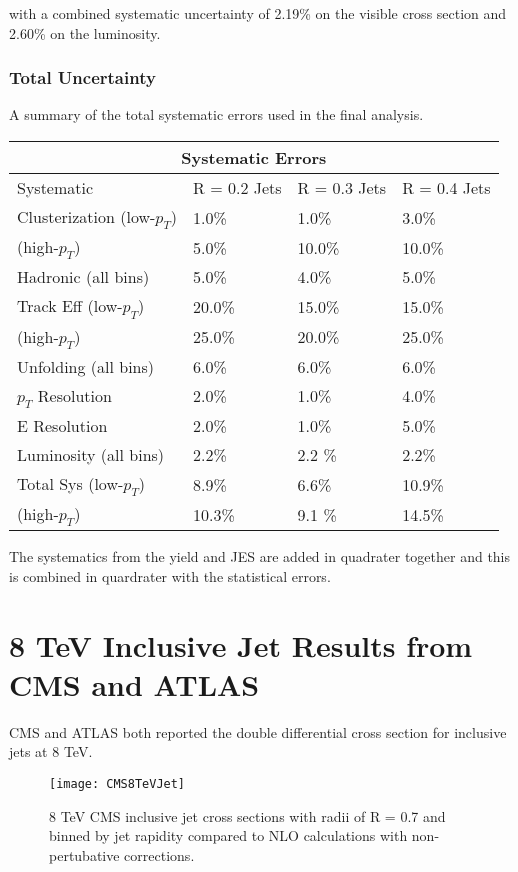 \noindent
with a combined systematic uncertainty of 2.19\% on the visible cross section and 2.60\% on the luminosity. 


\subsubsection{Total Uncertainty}

A summary of the total systematic errors used in the final analysis.

\begin{tabular}{ |p{5cm}||p{3cm}|p{3cm}|p{3cm}|  }
 \hline
 \multicolumn{4}{|c|}{Systematic Errors} \\
 \hline
 Systematic &R = 0.2 Jets & R = 0.3 Jets& R = 0.4 Jets\\
 \hline
Clusterization (low-$p_{T}$) & 1.0\%    &1.0\%&  3.0\%\\
 (high-$p_{T}$)           &  5.0\%  & 10.0\%   &  10.0\%\\
Hadronic (all bins)&   5.0\% & 4.0\% & 5.0\%\\
Track Eff (low-$p_{T}$)&20.0\% & 15.0\% & 15.0\%\\
 (high-$p_{T}$)            &  25.0\%  & 20.0\%   &  25.0\%\\
Unfolding (all bins)& 6.0\% & 6.0\%&  6.0\%\\
$p_{T}$ Resolution & 2.0\% & 1.0\% & 4.0\%\\
E Resolution& 2.0\%   &1.0\% & 5.0\%\\
Luminosity (all bins) & 2.2\%  & 2.2 \% & 2.2\%\\
 \hline
 \hline
Total Sys (low-$p_{T}$) & 8.9\%  & 6.6\% & 10.9\%\\
(high-$p_{T}$) & 10.3\%  & 9.1 \% & 14.5\%\\
\hline
\end{tabular}


\noindent

The systematics from the yield and JES are added in quadrater together and this is combined in quardrater with the statistical errors.

\section{8 TeV Inclusive Jet Results from CMS and ATLAS}

CMS\cite{CMS:2013kda} and ATLAS\cite{Aaboud:2017dvo} both reported the double differential cross section for inclusive jets at 8 TeV.  

\begin{figure}[h]
\texttt{[image: CMS8TeVJet]}
\centering
\caption{8 TeV CMS inclusive jet cross sections with radii of R = 0.7 and binned by jet rapidity compared to NLO calculations with non-pertubative corrections\cite{CMS:2013kda}.}
\label{fig:CMS8TeVRescale}
\end{figure}

